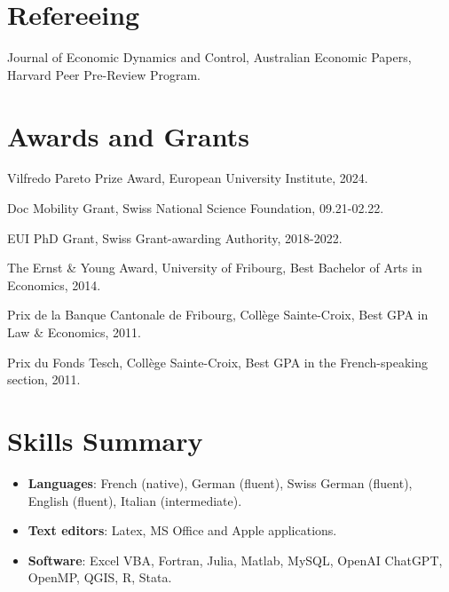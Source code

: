 \documentclass[letterpaper,11pt]{article}
\makeatletter
\newcommand{\resumeItem}[2]{
  \item\small{
    \textbf{#1}{: #2 \vspace{-2pt}}
  }
}
\newcommand{\resumeSubheading}[4]{
  \vspace{-1pt}\item
    \begin{tabular*}{0.97\textwidth}{l@{\extracolsep{\fill}}r}
      \textbf{#1} & #2 \\
      \textit{\small#3} & \textit{\small #4} \\
    \end{tabular*}\vspace{-5pt}
}
\newcommand{\resumeSubItem}[2]{\resumeItem{#1}{#2}\vspace{-1pt}}
\newcommand{\resumeSubHeadingListStart}{\begin{itemize}[leftmargin=*]}
\newcommand{\resumeSubHeadingListEnd}{\end{itemize}}
\makeatother
\begin{document}




\section{Refereeing}
\begin{description}[font=$\bullet$]
	\item {Journal of Economic Dynamics and Control, Australian Economic Papers, Harvard Peer Pre-Review Program.}
\end{description}

\section{Awards and Grants}
\begin{description}[font=$\bullet$]
	\item {Vilfredo Pareto Prize Award, European University Institute, 2024.}
	\item {Doc Mobility Grant, Swiss National Science Foundation, 09.21-02.22.}
	\item {EUI PhD Grant, Swiss Grant-awarding Authority, 2018-2022.}
	\item {The Ernst \& Young Award, University of Fribourg, Best Bachelor of Arts in Economics, 2014.}
	\item {Prix de la Banque Cantonale de Fribourg, Coll\`{e}ge Sainte-Croix, Best GPA in Law \& Economics, 2011.}
	\item {Prix du Fonds Tesch, Coll\`{e}ge Sainte-Croix, Best GPA in the French-speaking section, 2011.}
\end{description}


%
\section{Skills Summary}
\resumeSubHeadingListStart
\resumeSubItem{Languages}{French (native), German (fluent), Swiss German (fluent), English (fluent), Italian (intermediate).}
\resumeSubItem{Text editors}{Latex, MS Office and Apple applications.}
\resumeSubItem{Software}{Excel VBA, Fortran, Julia, Matlab, MySQL, OpenAI ChatGPT, OpenMP, QGIS, R, Stata.}
\resumeSubHeadingListEnd

\end{document}
